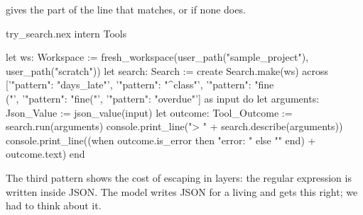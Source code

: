  gives the part of the line that matches, or
 if none does.

\begin{tryit}{try_search.nex}
intern Tools

let ws: Workspace := fresh_workspace(user_path("sample_project"), user_path("scratch"))
let search: Search := create Search.make(ws)
across ['{"pattern": "days_late"}', '{"pattern": "^class"}', '{"pattern": "fine\\("}',
    '{"pattern": "fine("}', '{"pattern": "overdue"}'] as input do
  let arguments: Json_Value := json_value(input)
  let outcome: Tool_Outcome := search.run(arguments)
  console.print_line("> " + search.describe(arguments))
  console.print_line((when outcome.is_error then "error: " else "" end) + outcome.text)
end
\end{tryit}

The third pattern shows the cost of escaping in layers: the regular
expression  is written 
inside JSON. The model writes JSON for a living and gets this right; we
had to think about it.
